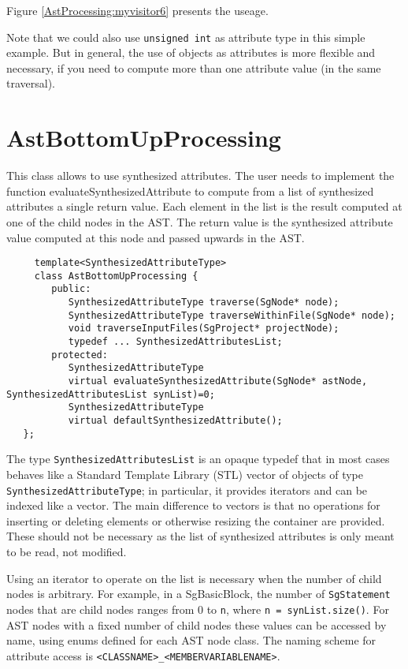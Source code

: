 Figure \ref{AstProcessing:myvisitor6} presents the useage.


Note that we could also use {\tt unsigned int} as attribute type in this 
simple example. But in general, the use of objects as attributes is more 
flexible and necessary, if you need to compute more than one attribute 
value (in the same traversal).

\section{AstBottomUpProcessing}
\label{AstProcessing:AstBottomUpProcessing}

This class allows to use synthesized attributes. The user needs to
implement the function evaluateSynthesizedAttribute to compute from a
list of synthesized attributes a single return value. Each element in the list is the
result computed at one of the child nodes in the AST. The return value is the synthesized
attribute value computed at this node and passed upwards in the AST.

{\indent
{\mySmallFontSize
\begin{verbatim}
     template<SynthesizedAttributeType>
     class AstBottomUpProcessing {
        public:
           SynthesizedAttributeType traverse(SgNode* node);
           SynthesizedAttributeType traverseWithinFile(SgNode* node);
           void traverseInputFiles(SgProject* projectNode);
           typedef ... SynthesizedAttributesList;
        protected:
           SynthesizedAttributeType
           virtual evaluateSynthesizedAttribute(SgNode* astNode, SynthesizedAttributesList synList)=0;
           SynthesizedAttributeType
           virtual defaultSynthesizedAttribute();
   };
\end{verbatim}
}}

   The type {\tt SynthesizedAttributesList} is an opaque typedef that in most
cases behaves like a Standard Template Library (STL) vector of objects of type
{\tt SynthesizedAttributeType}; in particular, it provides iterators and can
be indexed like a vector. The main difference to vectors is that no
operations for inserting or deleting elements or otherwise resizing the
container are provided. These should not be necessary as the list of
synthesized attributes is only meant to be read, not modified.

Using an iterator to operate on the list is necessary when the number of child nodes
is arbitrary. For example, in a SgBasicBlock, the number of {\tt SgStatement} nodes that are
child nodes ranges from 0 to {\tt n}, where {\tt n = synList.size()}.
For AST nodes with a fixed number of child nodes these values can be accessed by name,
using enums defined for each AST node class. The naming scheme for attribute access is
{\tt <CLASSNAME>\_<MEMBERVARIABLENAME>}.

